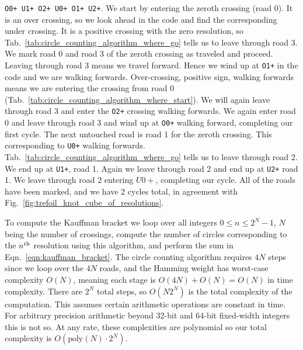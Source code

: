         \texttt{O0+ U1+ O2+ U0+ O1+ U2+}.
        We start by entering the zeroth crossing
        (road 0). It is an over crossing, so we look ahead in the code and
        find the corresponding under crossing. It is a positive crossing with
        the zero resolution, so
        Tab.~\ref{tab:circle_counting_algorithm_where_go} tells
        us to leave through road 3. We mark road 0 and road 3 of the zeroth
        crossing as traveled and proceed. Leaving through road 3 means we
        travel forward. Hence we wind up at \texttt{O1+} in the code and we are
        walking forwards. Over-crossing, positive sign, walking forwards means
        we are entering the crossing from road 0
        (Tab.~\ref{tab:circle_counting_algorithm_where_start}). We will again
        leave through road 3 and enter the \texttt{O2+}
        crossing walking forwards. We again enter road 0 and leave
        through road 3 and wind up at \texttt{O0+} walking forward,
        completing our first cycle. The next untouched
        road is road 1 for the zeroth crossing. This corresponding to
        \texttt{U0+} walking forwards.
        Tab.~\ref{tab:circle_counting_algorithm_where_go}
        tells us to leave through road 2. We end up at \texttt{U1+}, road 1.
        Again we leave through road 2 and end up at \texttt{U2+} road 1.
        We leave through road 2 entering $U0+$, completing our cycle.
        All of the roads have been marked, and we have 2 cycles total,
        in agreement with Fig.~\ref{fig:trefoil_knot_cube_of_resolutions}.
        \par\hfill\par
        To compute the Kauffman bracket we loop over all integers
        $0\leq{n}\leq{2}^{N}-1$, $N$ being the number of crossings, compute the
        number of circles corresponding to the $n^{\small\textrm{th}}$
        resolution using this
        algorithm, and perform the sum in Eqn.~\ref{eqn:kauffman_bracket}. The
        circle counting algorithm requires $4N$ steps since we loop over the
        $4N$ roads, and the Hamming weight has worst-case complexity $O(N)$,
        meaning each stage is $O(4N)+O(N)=O(N)$ in time complexity. There are
        $2^{N}$ total steps, so $O(N2^{N})$ is the total complexity of the
        computation. This assumes certain arithmetic operations are constant
        in time. For arbitrary precision arithmetic beyond 32-bit and 64-bit
        fixed-width integers this is not so. At any rate, these complexities are
        polynomial so our total complexity is $O(\textrm{poly}(N)\cdot{2}^{N})$.
